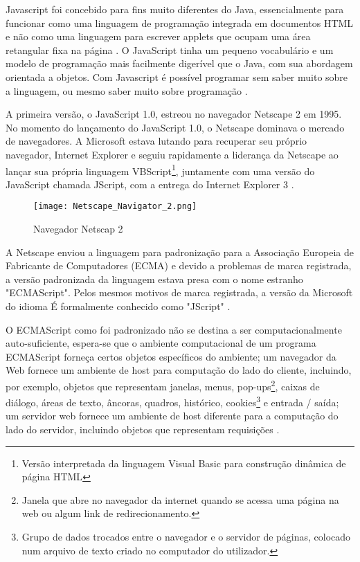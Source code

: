 Javascript foi concebido para fins muito diferentes do Java, essencialmente para funcionar como uma linguagem de programação integrada em documentos HTML e não como uma linguagem para escrever applets que ocupam uma área retangular fixa na página \citep{goodman2007javascript}. O JavaScript tinha um pequeno vocabulário e um modelo de programação mais facilmente digerível que o Java, com sua abordagem orientada a objetos. Com Javascript é possível programar sem saber muito sobre a linguagem, ou mesmo saber muito sobre programação \citep{crockford2008javascript}.

A primeira versão, o JavaScript 1.0, estreou no navegador Netscape 2 em 1995. No momento do lançamento do JavaScript 1.0, o Netscape dominava o mercado de navegadores. A Microsoft estava lutando para recuperar seu próprio navegador, Internet Explorer e seguiu rapidamente a liderança da Netscape ao lançar sua própria linguagem VBScript\footnote{Versão interpretada da linguagem Visual Basic para construção dinâmica de página HTML}, juntamente com uma versão do JavaScript chamada JScript, com a entrega do Internet Explorer 3 \citep{keith2010dom}.

\begin{figure}[!htb]
	\centering
	\texttt{[image: Netscape\_Navigator\_2.png]}
	\caption{Navegador Netscap 2}
	\label{Netscape}
\end{figure}

A Netscape enviou a linguagem para padronização para a Associação Europeia de Fabricante de Computadores (ECMA) e devido a problemas de marca registrada, a versão padronizada da linguagem estava presa com o nome estranho "ECMAScript". Pelos mesmos motivos de marca registrada, a versão da Microsoft do idioma É formalmente conhecido como "JScript" \citep{flanagan2011javascript}. 

O ECMAScript como foi padronizado não se destina a ser computacionalmente auto-suficiente, espera-se que o ambiente computacional de um programa ECMAScript forneça certos objetos específicos do ambiente; um navegador da Web fornece um ambiente de host para computação do lado do cliente, incluindo, por exemplo, objetos que representam janelas, menus, pop-ups\footnote{Janela que abre no navegador da internet quando se acessa uma página na web ou algum link de redirecionamento.}, caixas de diálogo, áreas de texto, âncoras, quadros, histórico, cookies\footnote{Grupo de dados trocados entre o navegador e o servidor de páginas, colocado num arquivo de texto criado no computador do utilizador.} e entrada / saída; um servidor web fornece um ambiente de host diferente para a computação do lado do servidor, incluindo objetos que representam requisições \citep{ecmascript2016}.

